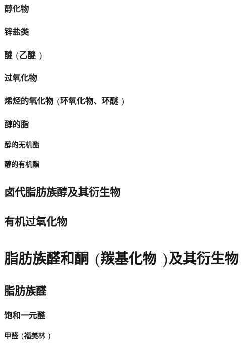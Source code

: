 \documentclass[UTF8]{../03-Chemistry}
\begin{document}
        \subsubsection{醇化物}
        \subsubsection{锌盐类}
        \subsubsection{醚 (乙醚 )}
        \subsubsection{过氧化物}
        \subsubsection{烯烃的氧化物 (环氧化物、环醚 )}
        \subsubsection{醇的脂}
            \paragraph{醇的无机酯}
            \paragraph{醇的有机酯}
    \subsection{卤代脂肪族醇及其衍生物}
    \subsection{有机过氧化物}


\section{脂肪族醛和酮 (羰基化物 )及其衍生物}
    \subsection{脂肪族醛}
        \subsubsection{饱和一元醛}
            \paragraph{甲醛 (福美林 )}
\end{document}
